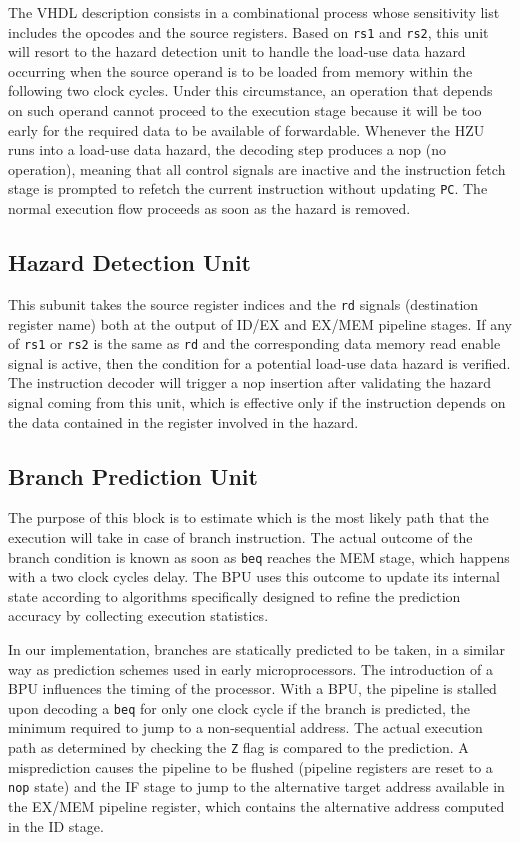 The VHDL description consists in a combinational process whose sensitivity list includes the opcodes and the source registers. Based on \texttt{rs1} and \texttt{rs2}, this unit will resort to the hazard detection unit to handle the load-use data hazard occurring when the source operand is to be loaded from memory within the following two clock cycles. Under this circumstance, an operation that depends on such operand cannot proceed to the execution stage because it will be too early for the required data to be available of forwardable. Whenever the HZU runs into a load-use data hazard, the decoding step produces a nop (no operation), meaning that all control signals are inactive and the instruction fetch stage is prompted to refetch the current instruction without updating \texttt{PC}. The normal execution flow proceeds as soon as the hazard is removed.

\subsection{Hazard Detection Unit} This subunit takes the source register indices and the \texttt{rd} signals (destination register name) both at the output of ID/EX and EX/MEM pipeline stages. If any of \texttt{rs1} or \texttt{rs2} is the same as \texttt{rd} and the corresponding data memory read enable signal is active, then the condition for a potential load-use data hazard is verified. The instruction decoder will trigger a nop insertion after validating the hazard signal coming from this unit, which is effective only if the instruction depends on the data contained in the register involved in the hazard.


\subsection{Branch Prediction Unit} The purpose of this block is to estimate which is the most likely path that the execution will take in case of branch instruction. The actual outcome of the branch condition is known as soon as \texttt{beq} reaches the MEM stage, which happens with a two clock cycles delay. The BPU uses this outcome to update its internal state according to algorithms specifically designed to refine the prediction accuracy by collecting execution statistics.

In our implementation, branches are statically predicted to be taken, in a similar way as prediction schemes used in early microprocessors. The introduction of a BPU influences the timing of the processor. With a BPU, the pipeline is stalled upon decoding a \texttt{beq} for only one clock cycle if the branch is predicted, the minimum required to jump to a non-sequential address. The actual execution path as determined by checking the \texttt{Z} flag is compared to the prediction. A misprediction causes the pipeline to be flushed (pipeline registers are reset to a \texttt{nop} state) and the IF stage to jump to the alternative target address available in the EX/MEM pipeline register, which contains the alternative address computed in the ID stage.

